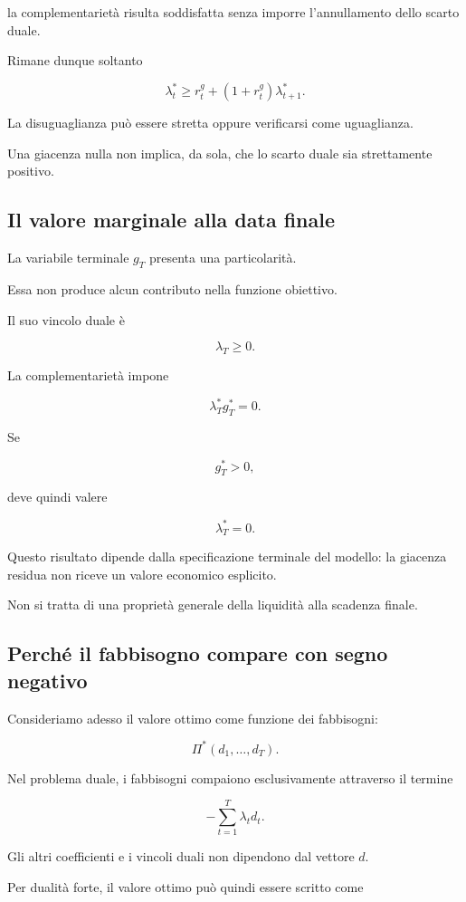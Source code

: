 \noindent la complementariet\`{a} risulta
soddisfatta senza imporre
l'annullamento dello scarto duale.

Rimane dunque soltanto

\[
\boxed{
\lambda_t^*
\geq
r_t^g+(1+r_t^g)\lambda_{t+1}^*.
}
\]

La disuguaglianza pu\`{o} essere
stretta oppure verificarsi come
uguaglianza.

Una giacenza nulla non implica,
da sola, che lo scarto duale
sia strettamente positivo.

\subsection{Il valore marginale alla data finale}

La variabile terminale $g_T$ presenta
una particolarit\`{a}.

Essa non produce alcun contributo
nella funzione obiettivo.

Il suo vincolo duale \`{e}

\[
\lambda_T\geq0.
\]

La complementariet\`{a} impone

\[
\lambda_T^*g_T^*=0.
\]

Se

\[
g_T^*>0,
\]

deve quindi valere

\[
\boxed{\lambda_T^*=0.}
\]

Questo risultato dipende dalla
specificazione terminale del modello:
la giacenza residua non riceve
un valore economico esplicito.

Non si tratta di una propriet\`{a}
generale della liquidit\`{a}
alla scadenza finale.

\subsection{Perch\'{e} il fabbisogno
compare con segno negativo}

Consideriamo adesso il valore ottimo
come funzione dei fabbisogni:

\[
\Pi^*(d_1,\ldots,d_T).
\]

Nel problema duale, i fabbisogni
compaiono esclusivamente attraverso
il termine

\[
-\sum_{t=1}^{T}\lambda_t d_t.
\]

Gli altri coefficienti e i vincoli duali
non dipendono dal vettore $d$.

Per dualit\`{a} forte, il valore ottimo
pu\`{o} quindi essere scritto come

